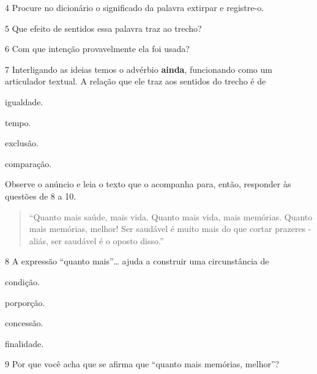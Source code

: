 \num{4} Procure no dicionário o significado da palavra extirpar e
registre-o. 


\num{5} Que efeito de sentidos essa palavra traz ao trecho? 


\num{6} Com que intenção provavelmente ela foi usada? 


\num{7} Interligando as ideias temos o advérbio \textbf{ainda},
funcionando como um articulador textual. A relação que ele traz aos
sentidos do trecho é de

\begin{boxlist}
 igualdade.

 tempo.

 exclusão.

 comparação.
\end{boxlist}

Observe o anúncio e leia o texto que o acompanha para, então, responder
às questões de 8 a 10.


\begin{quote}
``Quanto mais saúde, mais vida. Quanto mais vida, mais memórias. Quanto
mais memórias, melhor! Ser saudável é muito mais do que cortar prazeres
- aliás, ser saudável é o oposto disso.''
\end{quote}

\num{8} A expressão ``quanto mais''\ldots{} ajuda a construir uma
circunstância de

\begin{boxlist}
 condição.

 porporção.

 concessão.

 finalidade.
\end{boxlist}

\num{9} Por que você acha que se afirma que ``quanto mais memórias,
melhor''? 

